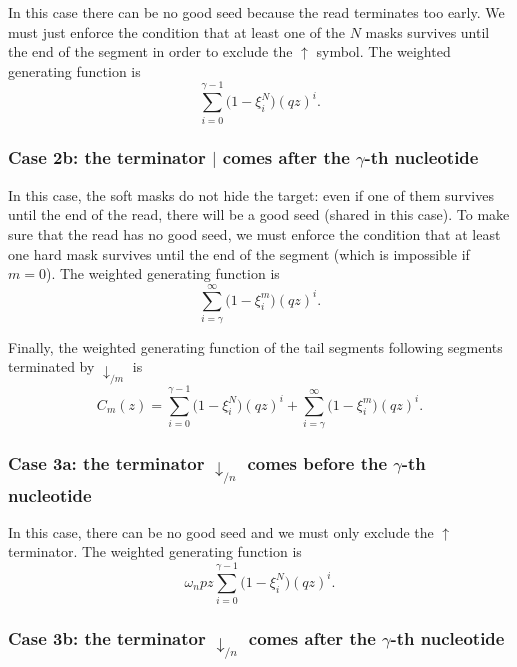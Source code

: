 \documentclass{article}
\begin{document}
In this case there can be no good seed because the read terminates too
early. We must just enforce the condition that at least one of the $N$
masks survives until the end of the segment in order to exclude the
$\uparrow$ symbol. The weighted generating function is
\begin{equation*}
\sum_{i=0}^{\gamma-1} \Big(1 - \xi_i^N \Big) (qz)^i.
\end{equation*}

\subsubsection*{Case 2b: the terminator $|$ comes after the $\gamma$-th
nucleotide}

In this case, the soft masks do not hide the target: even if one of them
survives until the end of the read, there will be a good seed (shared in
this case). To make sure that the read has no good seed, we must enforce
the condition that at least one hard mask survives until the end of the
segment (which is impossible if $m = 0$). The weighted generating function
is
\begin{equation*}
\sum_{i=\gamma}^\infty \Big(1 - \xi_i^m \Big) (qz)^i.
\end{equation*}

Finally, the weighted generating function of the tail segments following
segments terminated by $\downarrow_{/m}$ is
\begin{equation}
\label{eq:C}
C_m(z) =
\sum_{i=0}^{\gamma-1} \Big(1 - \xi_i^N \Big) (qz)^i +
  \sum_{i=\gamma}^\infty \Big(1 - \xi_i^m \Big) (qz)^i.
\end{equation}

\subsubsection*{Case 3a: the terminator $\downarrow_{/n}$ comes before the
$\gamma$-th nucleotide}

In this case, there can be no good seed and we must only exclude the
$\uparrow$ terminator. The weighted generating function is
\begin{equation}
\omega_n pz \sum_{i=0}^{\gamma-1} \Big(1 - \xi_i^N \Big) (qz)^i.
\end{equation}

\subsubsection*{Case 3b: the terminator $\downarrow_{/n}$ comes after the
$\gamma$-th nucleotide}
\end{document}

